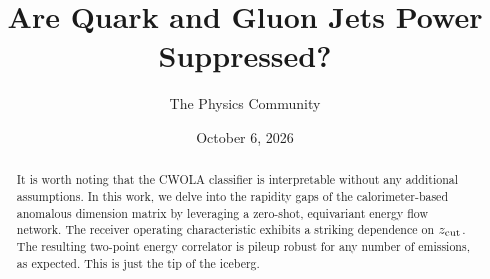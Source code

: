 \documentclass[11pt]{article}
\title{Are Quark and Gluon Jets Power Suppressed?}
\author{The Physics Community}
\date{October 6, 2026}
\numberwithin{equation}{section}
\theoremstyle{definition}
\theoremstyle{remark}
\begin{document}
\maketitle
\begin{abstract}
It is worth noting that the CWOLA classifier is interpretable without
any additional assumptions. In this work, we delve into the rapidity
gaps of the calorimeter-based anomalous dimension matrix by leveraging a
zero-shot, equivariant energy flow network. The receiver operating
characteristic exhibits a striking dependence on $z_{\rm cut}$. The
resulting two-point energy correlator is pileup robust for any number of
emissions, as expected. This is just the tip of the iceberg.
\end{abstract}
\tableofcontents



\nocite{*}


\end{document}
